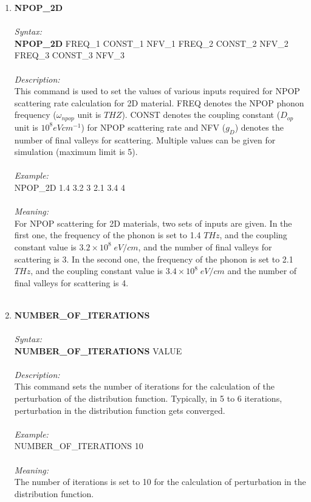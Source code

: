 \documentclass[12pt]{article}
\begin{document}
\begin{enumerate}
    \item \textbf{NPOP\_2D}   \\ \\
    \textit{Syntax:} \\
    \textbf{NPOP\_2D} FREQ\_1 CONST\_1 NFV\_1 FREQ\_2 CONST\_2 NFV\_2 FREQ\_3 CONST\_3 NFV\_3 \\ \\
    \textit{Description:} \\
    This command is used to set the values of various inputs required for NPOP scattering rate calculation for 2D material. FREQ denotes the NPOP phonon frequency ($\omega_{npop}$ unit is $THZ$). CONST denotes the coupling constant ($D_{op}$ unit is $10^8 eV cm^{-1}$) for NPOP scattering rate and NFV ($g_D$) denotes the number of final valleys for scattering. Multiple values can be given for simulation (maximum limit is 5). \\ \\
    \textit{Example:} \\
    NPOP\_2D 1.4 3.2 3 2.1 3.4 4  \\ \\
    \textit{Meaning:} \\  
    For NPOP scattering for 2D materials, two sets of inputs are given. In the first one, the frequency of the phonon is set to 1.4 $THz$, and the coupling constant value is $3.2 \times 10^{8} \; eV/cm$, and the number of final valleys for scattering is 3. In the second one, the frequency of the phonon is set to 2.1 $THz$, and the coupling constant value is $3.4 \times 10^{8} \; eV/cm$ and the number of final valleys for scattering is 4.    \\ \\
    
    \item \textbf{NUMBER\_OF\_ITERATIONS }     \\ \\
    \textit{Syntax:} \\
    \textbf{NUMBER\_OF\_ITERATIONS} VALUE \\ \\
    \textit{Description:} \\
    This command sets the number of iterations for the calculation of the perturbation of the distribution function. Typically, in 5 to 6 iterations, perturbation in the distribution function gets converged. \\ \\
    \textit{Example:} \\
    NUMBER\_OF\_ITERATIONS 10 \\ \\
    \textit{Meaning:} \\    
    The number of iterations is set to 10 for the calculation of perturbation in the distribution function. \\ \\
    

\end{enumerate}
\end{document}

